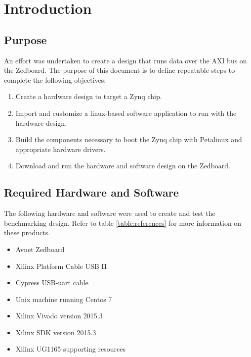 \section{Introduction}

\subsection{Purpose}
An effort was undertaken to create a design that runs data over the AXI bus on the Zedboard.  The purpose of this document is to define repeatable steps to complete the following objectives:

\begin{enumerate}

\item Create a hardware design to target a Zynq chip.
\item Import and customize a linux-based software application to run with the hardware design.
\item Build the components necessary to boot the Zynq chip with Petalinux and appropriate hardware drivers.
\item Download and run the hardware and software design on the Zedboard.
\end{enumerate}

\subsection{Required Hardware and Software}
The following hardware and software were used to create and test the benchmarking design.  Refer to table \ref{table:references} for more information on these products.
\begin{itemize}
\item Avnet Zedboard
\item Xilinx Platform Cable USB II
\item Cypress USB-uart cable
\item Unix machine running Centos 7
\item Xilinx Vivado version 2015.3
\item Xilinx SDK version 2015.3
\item Xilinx UG1165 supporting resources
\end{itemize}

